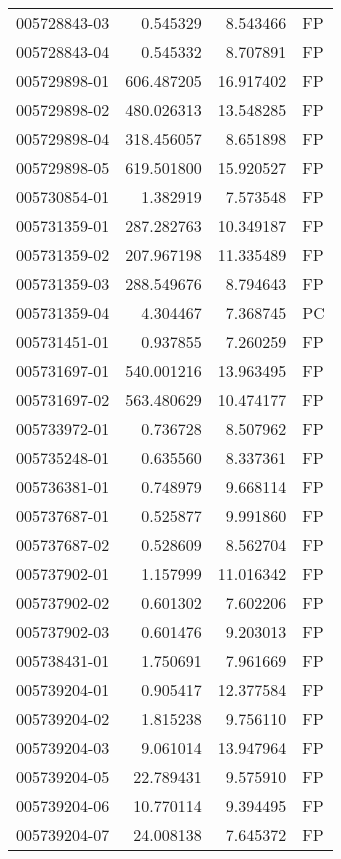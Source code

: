 \begin{tabular}{lrrl}
005728843-03 &    0.545329 &     8.543466 &   FP \\
005728843-04 &    0.545332 &     8.707891 &   FP \\
005729898-01 &  606.487205 &    16.917402 &   FP \\
005729898-02 &  480.026313 &    13.548285 &   FP \\
005729898-04 &  318.456057 &     8.651898 &   FP \\
005729898-05 &  619.501800 &    15.920527 &   FP \\
005730854-01 &    1.382919 &     7.573548 &   FP \\
005731359-01 &  287.282763 &    10.349187 &   FP \\
005731359-02 &  207.967198 &    11.335489 &   FP \\
005731359-03 &  288.549676 &     8.794643 &   FP \\
005731359-04 &    4.304467 &     7.368745 &   PC \\
005731451-01 &    0.937855 &     7.260259 &   FP \\
005731697-01 &  540.001216 &    13.963495 &   FP \\
005731697-02 &  563.480629 &    10.474177 &   FP \\
005733972-01 &    0.736728 &     8.507962 &   FP \\
005735248-01 &    0.635560 &     8.337361 &   FP \\
005736381-01 &    0.748979 &     9.668114 &   FP \\
005737687-01 &    0.525877 &     9.991860 &   FP \\
005737687-02 &    0.528609 &     8.562704 &   FP \\
005737902-01 &    1.157999 &    11.016342 &   FP \\
005737902-02 &    0.601302 &     7.602206 &   FP \\
005737902-03 &    0.601476 &     9.203013 &   FP \\
005738431-01 &    1.750691 &     7.961669 &   FP \\
005739204-01 &    0.905417 &    12.377584 &   FP \\
005739204-02 &    1.815238 &     9.756110 &   FP \\
005739204-03 &    9.061014 &    13.947964 &   FP \\
005739204-05 &   22.789431 &     9.575910 &   FP \\
005739204-06 &   10.770114 &     9.394495 &   FP \\
005739204-07 &   24.008138 &     7.645372 &   FP \\

\end{tabular}
